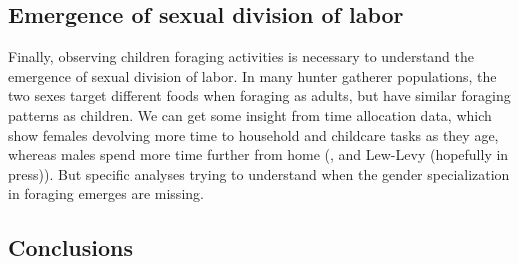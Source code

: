\subsection{Emergence of sexual division of labor}
Finally, observing children foraging activities is necessary to understand the emergence of sexual division of labor. In many hunter gatherer populations, the two sexes target different foods when foraging as adults, but have similar foraging patterns as children. We can get some insight from time allocation data, which show females devolving more time to household and childcare tasks as they age, whereas males spend more time further from home (\cite{froehle_physical_2019}, and Lew-Levy (hopefully in press)). But specific analyses trying to understand when the gender specialization in foraging emerges are missing.

\subsection{Conclusions}





